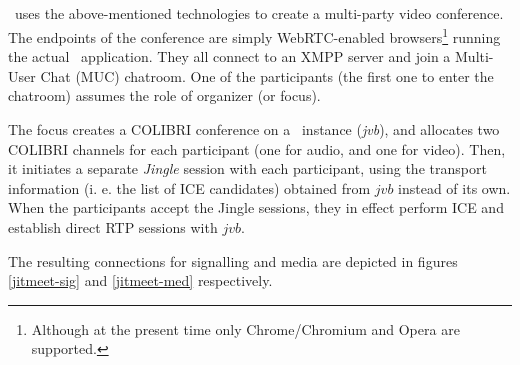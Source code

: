 \documentclass[twoside,openright,a4paper,12pt,english]{article}
\begin{document}
\subsection{\jm}
\label{intro-jm}
\jm\ uses the above-mentioned technologies to create a multi-party video conference.
The endpoints of the conference are simply WebRTC-enabled
browsers\footnote{Although at the present time only Chrome/Chromium and Opera are
supported.} running the actual \jm\ application. They all connect to an XMPP
server and join a Multi-User Chat (MUC) chatroom. One of the participants (the
first one to enter the chatroom) assumes the role of organizer (or focus).

The focus creates a COLIBRI conference on a \jvb\ instance (\emph{jvb}), and allocates
two COLIBRI channels for each participant (one for audio, and one for video).
Then, it initiates a separate \emph{Jingle} session with
each participant, using the
transport information (i. e. the list of ICE candidates) obtained from $jvb$
instead of its own. When the participants accept the Jingle sessions, they in
effect perform ICE and establish direct RTP sessions with $jvb$.

The resulting connections for signalling and media are depicted in figures
\ref{jitmeet-sig} and \ref{jitmeet-med} respectively.
\end{document}
